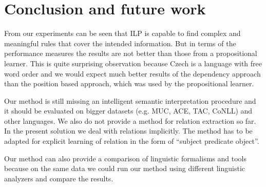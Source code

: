 \documentclass[runningheads,a4paper]{llncs}
\begin{document}










\section{Conclusion and future work}
From our experiments can be seen that ILP is capable to find complex and meaningful rules that cover the intended information. But in terms of the performance measures the results are not better than those from a propositional learner. This is quite surprising observation because Czech is a language with free word order and we would expect much better results of the dependency approach than the position based approach, which was used by the propositional learner.

Our method is still missing an intelligent semantic interpretation procedure and it should be evaluated on bigger datasets (e.g. MUC, ACE, TAC, CoNLL) and other languages. We also do not provide a method for relation extraction so far. In the present solution we deal with relations implicitly. The method has to be adapted for explicit learning of relation in the form of ``subject predicate object''.

Our method can also provide a comparison of linguistic formalisms and tools because on the same data we could run our method using different linguistic analyzers and compare the results.








\end{document}
